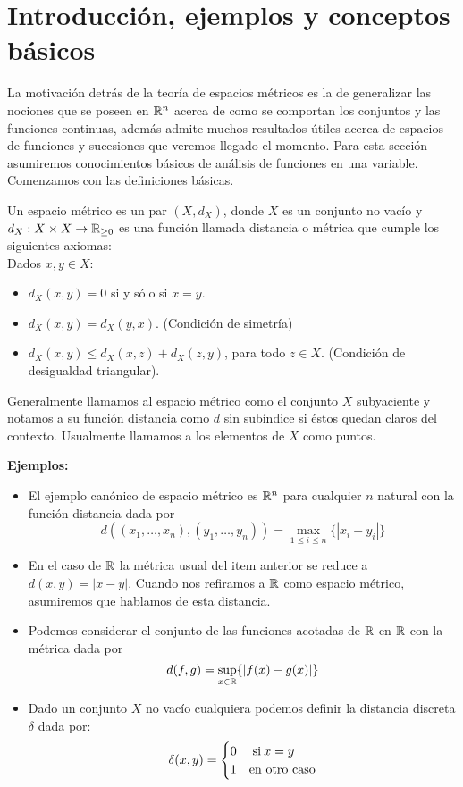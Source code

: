 \documentclass[12pt,a4paper]{book}
\begin{document}
\else
\fi

\section{Introducción, ejemplos y conceptos básicos}
La motivación detrás de la teoría de espacios métricos es la de generalizar las nociones que se poseen en $\mathbb{R}^n$ acerca de como se comportan los conjuntos y las funciones continuas, además admite muchos resultados útiles acerca de espacios de funciones y sucesiones que veremos llegado el momento. Para esta sección asumiremos conocimientos básicos de análisis de funciones en una variable.\\
Comenzamos con las definiciones básicas.
\begin{defi}
Un espacio métrico es un par $(X,d_X)$, donde $X$ es un conjunto no vacío y $d_X: X \times X \rightarrow \mathbb{R}_{\geq 0}$ es una función llamada distancia o métrica que cumple los siguientes axiomas:\\
Dados $x,y \in X$:
\begin{itemize}
\item $d_X(x,y) = 0$ si y sólo si $x = y$.
\item $d_X(x,y) = d_X(y,x)$. (Condición de simetría)
\item $d_X(x,y) \leq d_X(x,z) + d_X(z,y)$, para todo $z \in X$. (Condición de desigualdad triangular).
\end{itemize}
Generalmente llamamos al espacio métrico como el conjunto $X$ subyaciente y notamos a su función distancia como $d$ sin subíndice si éstos quedan claros del contexto. Usualmente llamamos a los elementos de $X$ como puntos.
\end{defi}
\textbf{Ejemplos:}
\begin{itemize}
\item El ejemplo canónico de espacio métrico es $\mathbb{R}^n$ para cualquier $n$ natural con la función distancia dada por 
$$ d((x_1, \ldots, x_n), (y_1, \ldots, y_n))= \max_{1 \leq i \leq n} \{ | x_i - y_i |\}$$
\item En el caso de $\mathbb{R}$ la métrica usual del item anterior se reduce a $d(x,y)=|x-y|$. Cuando nos refiramos a $\mathbb{R}$ como espacio métrico, asumiremos que hablamos de esta distancia.
\item Podemos considerar el conjunto de las funciones acotadas de $\mathbb{R}$ en $\mathbb{R}$ con la métrica dada por
$$ d(f,g) = \sup_{x \in \mathbb{R}} \{ |f(x) - g(x)|\}$$
\item Dado un conjunto $X$ no vacío cualquiera podemos definir la distancia discreta $\delta$ dada por:
$$\delta(x,y)= \begin{cases}
0 &\mathrm{\;si\:} x=y \\
1 &\mbox{en otro caso}
\end{cases}
$$
\end{itemize}
\end{document}
